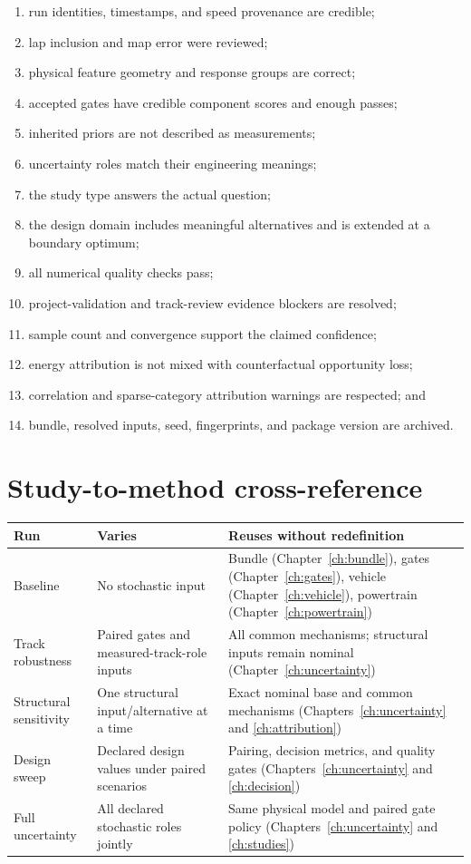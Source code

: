 \documentclass[11pt,oneside]{report}
\begin{document}
\begin{enumerate}
  \item run identities, timestamps, and speed provenance are credible;
  \item lap inclusion and map error were reviewed;
  \item physical feature geometry and response groups are correct;
  \item accepted gates have credible component scores and enough passes;
  \item inherited priors are not described as measurements;
  \item uncertainty roles match their engineering meanings;
  \item the study type answers the actual question;
  \item the design domain includes meaningful alternatives and is extended at a boundary
        optimum;
  \item all numerical quality checks pass;
  \item project-validation and track-review evidence blockers are resolved;
  \item sample count and convergence support the claimed confidence;
  \item energy attribution is not mixed with counterfactual opportunity loss;
  \item correlation and sparse-category attribution warnings are respected; and
  \item bundle, resolved inputs, seed, fingerprints, and package version are archived.
\end{enumerate}

\appendix
\chapter{Study-to-method cross-reference}

\begin{longtable}{p{}p{}p{}}
\toprule
Run & Varies & Reuses without redefinition \\
\midrule
\endhead
Baseline & No stochastic input & Bundle (Chapter~\ref{ch:bundle}), gates
(Chapter~\ref{ch:gates}), vehicle (Chapter~\ref{ch:vehicle}), powertrain
(Chapter~\ref{ch:powertrain}) \\
Track robustness & Paired gates and measured-track-role inputs & All common mechanisms;
structural inputs remain nominal (Chapter~\ref{ch:uncertainty}) \\
Structural sensitivity & One structural input/alternative at a time & Exact nominal base
and common mechanisms (Chapters~\ref{ch:uncertainty} and \ref{ch:attribution}) \\
Design sweep & Declared design values under paired scenarios & Pairing, decision metrics,
and quality gates (Chapters~\ref{ch:uncertainty} and \ref{ch:decision}) \\
Full uncertainty & All declared stochastic roles jointly & Same physical model and paired
gate policy (Chapters~\ref{ch:uncertainty} and \ref{ch:studies}) \\
\bottomrule
\end{longtable}
\end{document}
